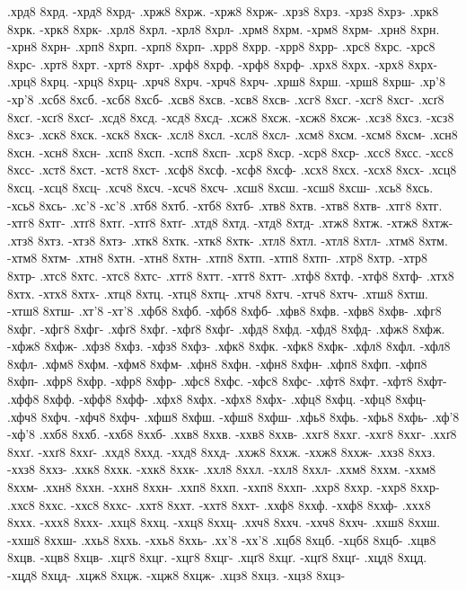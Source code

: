 {.хрд8 8хрд. -хрд8 8хрд-
.хрж8 8хрж. -хрж8 8хрж-
.хрз8 8хрз. -хрз8 8хрз-
.хрк8 8хрк. -хрк8 8хрк-
.хрл8 8хрл. -хрл8 8хрл-
.хрм8 8хрм. -хрм8 8хрм-
.хрн8 8хрн. -хрн8 8хрн-
.хрп8 8хрп. -хрп8 8хрп-
.хрр8 8хрр. -хрр8 8хрр-
.хрс8 8хрс. -хрс8 8хрс-
.хрт8 8хрт. -хрт8 8хрт-
.хрф8 8хрф. -хрф8 8хрф-
.хрх8 8хрх. -хрх8 8хрх-
.хрц8 8хрц. -хрц8 8хрц-
.хрч8 8хрч. -хрч8 8хрч-
.хрш8 8хрш. -хрш8 8хрш-
.хр'8 -хр'8
.хсб8 8хсб. -хсб8 8хсб-
.хсв8 8хсв. -хсв8 8хсв-
.хсг8 8хсг. -хсг8 8хсг-
.хсґ8 8хсґ. -хсґ8 8хсґ-
.хсд8 8хсд. -хсд8 8хсд-
.хсж8 8хсж. -хсж8 8хсж-
.хсз8 8хсз. -хсз8 8хсз-
.хск8 8хск. -хск8 8хск-
.хсл8 8хсл. -хсл8 8хсл-
.хсм8 8хсм. -хсм8 8хсм-
.хсн8 8хсн. -хсн8 8хсн-
.хсп8 8хсп. -хсп8 8хсп-
.хср8 8хср. -хср8 8хср-
.хсс8 8хсс. -хсс8 8хсс-
.хст8 8хст. -хст8 8хст-
.хсф8 8хсф. -хсф8 8хсф-
.хсх8 8хсх. -хсх8 8хсх-
.хсц8 8хсц. -хсц8 8хсц-
.хсч8 8хсч. -хсч8 8хсч-
.хсш8 8хсш. -хсш8 8хсш-
.хсь8 8хсь. -хсь8 8хсь-
.хс'8 -хс'8
.хтб8 8хтб. -хтб8 8хтб-
.хтв8 8хтв. -хтв8 8хтв-
.хтг8 8хтг. -хтг8 8хтг-
.хтґ8 8хтґ. -хтґ8 8хтґ-
.хтд8 8хтд. -хтд8 8хтд-
.хтж8 8хтж. -хтж8 8хтж-
.хтз8 8хтз. -хтз8 8хтз-
.хтк8 8хтк. -хтк8 8хтк-
.хтл8 8хтл. -хтл8 8хтл-
.хтм8 8хтм. -хтм8 8хтм-
.хтн8 8хтн. -хтн8 8хтн-
.хтп8 8хтп. -хтп8 8хтп-
.хтр8 8хтр. -хтр8 8хтр-
.хтс8 8хтс. -хтс8 8хтс-
.хтт8 8хтт. -хтт8 8хтт-
.хтф8 8хтф. -хтф8 8хтф-
.хтх8 8хтх. -хтх8 8хтх-
.хтц8 8хтц. -хтц8 8хтц-
.хтч8 8хтч. -хтч8 8хтч-
.хтш8 8хтш. -хтш8 8хтш-
.хт'8 -хт'8
.хфб8 8хфб. -хфб8 8хфб-
.хфв8 8хфв. -хфв8 8хфв-
.хфг8 8хфг. -хфг8 8хфг-
.хфґ8 8хфґ. -хфґ8 8хфґ-
.хфд8 8хфд. -хфд8 8хфд-
.хфж8 8хфж. -хфж8 8хфж-
.хфз8 8хфз. -хфз8 8хфз-
.хфк8 8хфк. -хфк8 8хфк-
.хфл8 8хфл. -хфл8 8хфл-
.хфм8 8хфм. -хфм8 8хфм-
.хфн8 8хфн. -хфн8 8хфн-
.хфп8 8хфп. -хфп8 8хфп-
.хфр8 8хфр. -хфр8 8хфр-
.хфс8 8хфс. -хфс8 8хфс-
.хфт8 8хфт. -хфт8 8хфт-
.хфф8 8хфф. -хфф8 8хфф-
.хфх8 8хфх. -хфх8 8хфх-
.хфц8 8хфц. -хфц8 8хфц-
.хфч8 8хфч. -хфч8 8хфч-
.хфш8 8хфш. -хфш8 8хфш-
.хфь8 8хфь. -хфь8 8хфь-
.хф'8 -хф'8
.ххб8 8ххб. -ххб8 8ххб-
.ххв8 8ххв. -ххв8 8ххв-
.ххг8 8ххг. -ххг8 8ххг-
.ххґ8 8ххґ. -ххґ8 8ххґ-
.ххд8 8ххд. -ххд8 8ххд-
.ххж8 8ххж. -ххж8 8ххж-
.ххз8 8ххз. -ххз8 8ххз-
.ххк8 8ххк. -ххк8 8ххк-
.ххл8 8ххл. -ххл8 8ххл-
.ххм8 8ххм. -ххм8 8ххм-
.ххн8 8ххн. -ххн8 8ххн-
.ххп8 8ххп. -ххп8 8ххп-
.ххр8 8ххр. -ххр8 8ххр-
.ххс8 8ххс. -ххс8 8ххс-
.ххт8 8ххт. -ххт8 8ххт-
.ххф8 8ххф. -ххф8 8ххф-
.ххх8 8ххх. -ххх8 8ххх-
.ххц8 8ххц. -ххц8 8ххц-
.ххч8 8ххч. -ххч8 8ххч-
.ххш8 8ххш. -ххш8 8ххш-
.ххь8 8ххь. -ххь8 8ххь-
.хх'8 -хх'8
.хцб8 8хцб. -хцб8 8хцб-
.хцв8 8хцв. -хцв8 8хцв-
.хцг8 8хцг. -хцг8 8хцг-
.хцґ8 8хцґ. -хцґ8 8хцґ-
.хцд8 8хцд. -хцд8 8хцд-
.хцж8 8хцж. -хцж8 8хцж-
.хцз8 8хцз. -хцз8 8хцз-
}
